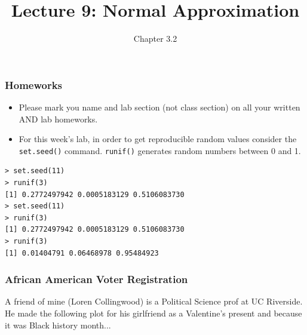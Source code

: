 \documentclass[handout]{beamer}
\title{Lecture 9: Normal Approximation}
\author{Chapter 3.2}
\date{}
\newcommand{\blue}[1]{\textcolor{blue2}{#1}}
\begin{document}
\begin{frame}
\titlepage
\end{frame}


\begin{frame}[fragile]
\frametitle{Homeworks}

\begin{itemize}
\item Please mark you name and lab section (not class section) on all your written \blue{AND} lab homeworks.
\pause\item For this week's lab, in order to get reproducible random values consider the \verb#set.seed()# command.  \verb#runif()# generates random numbers between 0 and 1.  
\end{itemize}

\begin{verbatim}
> set.seed(11)
> runif(3)
[1] 0.2772497942 0.0005183129 0.5106083730
> set.seed(11)
> runif(3)
[1] 0.2772497942 0.0005183129 0.5106083730
> runif(3)
[1] 0.01404791 0.06468978 0.95484923
\end{verbatim}


\end{frame}


\begin{frame}[fragile]
\frametitle{African American Voter Registration}

A friend of mine (Loren Collingwood) is a Political Science prof at UC Riverside.  He made the following plot for his girlfriend as a Valentine's present and because it was Black history month...

\end{frame}
\end{document}
